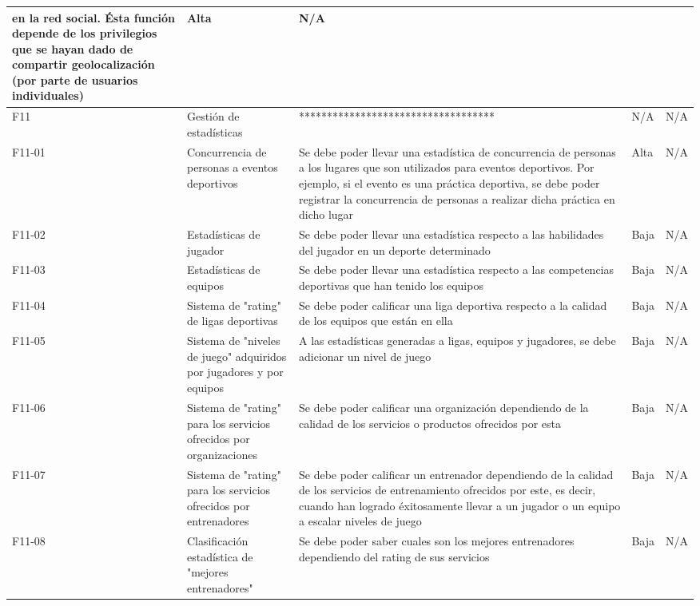 \begin{table}[!htb]
\begin{center}
\begin{supertabular}{|p{1cm}|p{4cm}|p{4cm}|p{2cm}|p{4cm}|}
en la red social. Ésta función depende de los privilegios que se hayan dado de compartir geolocalización (por parte de usuarios individuales) &
			Alta & 
			N/A \\
			\hline
			F11 & 
			Gestión de estadísticas & 
			*********************************** &
			N/A & 
			N/A \\
			\hline
			F11-01 & 
			Concurrencia de personas a eventos deportivos & 
			Se debe poder llevar una estadística de concurrencia de personas a los lugares que  son utilizados para eventos deportivos. Por ejemplo, si el evento es una práctica deportiva, se debe poder registrar la concurrencia de personas a realizar dicha práctica en dicho lugar &
			Alta & 
			N/A \\
			\hline
			F11-02 & 
			Estadísticas de jugador & 
			Se debe poder llevar una estadística respecto a las habilidades del jugador en un
deporte determinado &
			Baja & 
			N/A \\
			F11-03 & 
			Estadísticas de equipos & 
			Se debe poder llevar una estadística respecto a las competencias deportivas que
han tenido los equipos &
			Baja & 
			N/A \\
			\hline
			F11-04 & 
			Sistema de "rating" de ligas deportivas & 
			Se debe poder calificar una liga deportiva respecto a la calidad de los equipos que están en ella &
			Baja & 
			N/A \\
			\hline
			F11-05 & 
			Sistema de "niveles de juego" adquiridos por jugadores y por equipos & 
			A las estadísticas generadas a ligas, equipos y jugadores, se debe adicionar un nivel de juego &
			Baja & 
			N/A \\
			\hline
			F11-06 & 
			Sistema de "rating" para los servicios ofrecidos por organizaciones & 
			Se debe poder calificar una organización dependiendo de la calidad de los servicios o productos ofrecidos por esta &
			Baja & 
			N/A \\
			\hline
			F11-07 & 
			Sistema de "rating" para los servicios ofrecidos por entrenadores & 
			Se debe poder calificar un entrenador dependiendo de la calidad de los servicios de entrenamiento ofrecidos por este, es decir, cuando han logrado éxitosamente llevar a un jugador o un equipo a escalar niveles de juego &
			Baja & 
			N/A \\
			\hline
			F11-08 & 
			Clasificación estadística de "mejores entrenadores" & 
			Se debe poder saber cuales son los mejores entrenadores dependiendo del rating de sus servicios &
			Baja & 
			N/A \\
			\hline

\end{supertabular}
\end{center}
\end{table}
